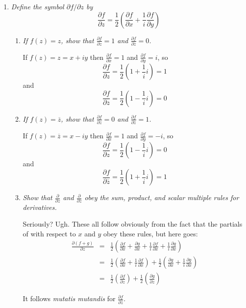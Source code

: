 \documentclass[letterpaper, 11pt]{article}
\begin{document}
\begin{enumerate}
\newpage

\item \emph{Define the symbol $\partial f / \partial z$ by $$\frac{\partial f}{\partial z} = \frac{1}{2} \left( \frac{\partial f}{\partial x} + \frac{1}{i} \frac{\partial f}{\partial y} \right)$$}
\begin{enumerate}
\item \emph{If $f(z) = z$, show that $\frac{\partial f}{\partial z} = 1$ and $\frac{\partial f}{\partial \overline{z}} = 0$.}

If $f(z) = z = x + iy$ then $\frac{\partial f}{\partial x} = 1$ and $\frac{\partial f}{\partial y} = i$, so
\[
\frac{\partial f}{\partial z} = \frac{1}{2}(1 + \frac{1}{i} i) = 1
\]
and
\[
\frac{\partial f}{\partial \overline{z}} = \frac{1}{2}(1 - \frac{1}{i} i) = 0
\]

\item \emph{If $f(z) = \overline{z}$, show that $\frac{\partial f}{\partial z} = 0$ and $\frac{\partial f}{\partial \overline{z}} = 1$.}

If $f(z) = \overline{z} = x - iy$ then $\frac{\partial f}{\partial x} = 1$ and $\frac{\partial f}{\partial y} = -i$, so
\[
\frac{\partial f}{\partial z} = \frac{1}{2}(1 - \frac{1}{i} i) = 0
\]
and
\[
\frac{\partial f}{\partial \overline{z}} = \frac{1}{2}(1 + \frac{1}{i} i) = 1
\]

\item \emph{Show that $\frac{\partial}{\partial z}$ and $\frac{\partial}{\partial \overline{z}}$ obey the sum, product, and scalar multiple rules for derivatives.}

Seriously?  Ugh.  These all follow obviously from the fact that the partials of with respect to $x$ and $y$ obey these rules, but here goes:
\begin{eqnarray*}
\frac{\partial (f+g)}{\partial z} &=& \frac{1}{2}\left(\frac{\partial f}{\partial x} + \frac{\partial g}{\partial x} + \frac{1}{i}\frac{\partial f}{\partial x} + \frac{1}{i}\frac{\partial g}{\partial x}\right) \\
&=& \frac{1}{2}\left(\frac{\partial f}{\partial x} + \frac{1}{i}\frac{\partial f}{\partial x}\right) + \frac{1}{2}\left(\frac{\partial g}{\partial x} + \frac{1}{i}\frac{\partial g}{\partial x}\right) \\
&=& \frac{1}{2}\left(\frac{\partial f}{\partial z}\right) + \frac{1}{2}\left(\frac{\partial g}{\partial z}\right)
\end{eqnarray*}

It follows \emph{mutatis mutandis} for $\frac{\partial f}{\partial \overline{z}}$.


\end{enumerate}
\end{enumerate}
\end{document}
